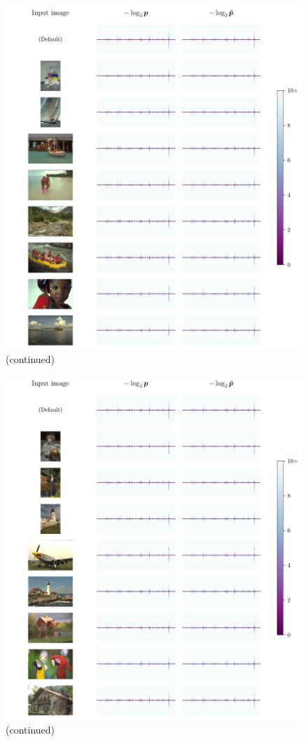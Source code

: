 \begin{figure}[htbp]
  \ContinuedFloat
  \centering
  \includegraphics[width=\linewidth]{img/pdf_compression/pdfs2.pdf}
  \caption[]{(continued)}
\end{figure}

\begin{figure}[htbp]
  \ContinuedFloat
  \centering
  \includegraphics[width=\linewidth]{img/pdf_compression/pdfs3.pdf}
  \caption[]{(continued)}
\end{figure}

